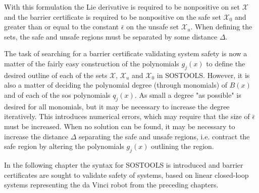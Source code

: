 \vspace{-15mm}
With this formulation the Lie derivative is required to be nonpositive on set $\mathcal{X}$ and the barrier certificate is required to be nonpositive on the safe set $\mathcal{X}_0$ and greater than or equal to the constant $\bar{\epsilon}$ on the unsafe set $\mathcal{X}_u$. When defining the sets, the safe and unsafe regions must be separated by some distance $\Delta$.

The task of searching for a barrier certificate validating system safety is now a matter of the fairly easy construction of the polynomials $g_j(x)$ to define the desired outline of each of the sets $\mathcal{X}$, $\mathcal{X}_u$ and $\mathcal{X}_0$ in SOSTOOLS. However, it is also a matter of deciding the polynomial degree (through monomials) of $B(x)$ and of each of the \gls{sos} polynomials $q_j(x)$. As small a degree "as possible" is desired for all monomials, but it may be necessary to increase the degree iteratively. This introduces numerical errors, which may require that the size of $\bar{\epsilon}$ must be increased. When no solution can be found, it may be necessary to increase the  distance $\Delta$ separating the safe and unsafe regions, i.e. contract the safe region by altering the polynomials $g_j(x)$ outlining the region.


In the following chapter the syntax for SOSTOOLS is introduced and barrier certificates are sought to validate safety of systems, based on linear closed-loop systems representing the da Vinci robot from the preceding chapters.

 
	


%

